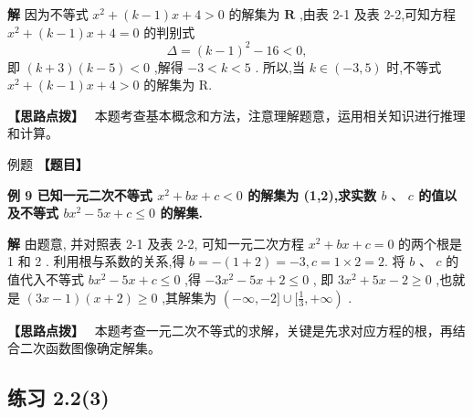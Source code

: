\documentclass[a4paper,10pt,oneside,fontset=none]{ctexbook}
\renewcommand{\geq}{\geqslant}
\renewcommand{\leq}{\leqslant}
\newcounter{example}[chapter]
\newenvironment{example}[1][]{\begin{exBox}{例题}{#1}}{\end{exBox}}
\numberwithin{equation}{chapter}
\newenvironment{solution}{\begin{solutionBox}}{\end{solutionBox}}
\newenvironment{hint}{\begin{hintBox}\textbf{【思路点拨】}~}{\end{hintBox}}
\begin{document}
\begin{solution}
\textbf{解}
因为不等式 ${x}^{2} + \left( {k - 1}\right) x + 4 > 0$ 的解集为 $\mathbf{R}$ ,由表 2-1 及表 2-2,可知方程 ${x}^{2} + \left( {k - 1}\right) x + 4 = 0$ 的判别式
$$
\Delta  = {\left( k - 1\right) }^{2} - {16} < 0,
$$
即 $\left( {k + 3}\right) \left( {k - 5}\right)  < 0$ ,解得 $- 3 < k < 5$ .
所以,当 $k \in  \left( {-3,5}\right)$ 时,不等式 ${x}^{2} + \left( {k - 1}\right) x + 4 > 0$ 的解集为 R.
\end{solution}

\begin{hint}
本题考查基本概念和方法，注意理解题意，运用相关知识进行推理和计算。
\end{hint}

\begin{example}
\textbf{【题目】}\par\vspace{0.3em}
\textbf{例 9 已知一元二次不等式 ${x}^{2} + {bx} + c < 0$ 的解集为 (1,2),求实数 $b\text{ 、 }c$ 的值以及不等式 $b{x}^{2} - {5x} + c \leq  0$ 的解集.}\par\vspace{0.3em}
\end{example}

\begin{solution}
\textbf{解}
由题意, 并对照表 2-1 及表 2-2, 可知一元二次方程 ${x}^{2} + {bx} + c = 0$ 的两个根是 1 和 2 . 利用根与系数的关系,得 $b =  - \left( {1 + 2}\right)  =  - 3, c = 1 \times  2 = 2.$
将 $b\text{ 、 }c$ 的值代入不等式 $b{x}^{2} - {5x} + c \leq  0$ ,得 $- 3{x}^{2} - {5x} + 2 \leq  0$ , 即 $3{x}^{2} + {5x} - 2 \geq  0$ ,也就是 $\left( {{3x} - 1}\right) \left( {x + 2}\right)  \geq  0$ ,其解集为 $\left( {-\infty , - 2\rbrack \cup \lbrack \frac{1}{3}, + \infty }\right)$ .
\end{solution}

\begin{hint}
本题考查一元二次不等式的求解，关键是先求对应方程的根，再结合二次函数图像确定解集。
\end{hint}

\subsection*{练习 2.2(3)}
\end{document}

